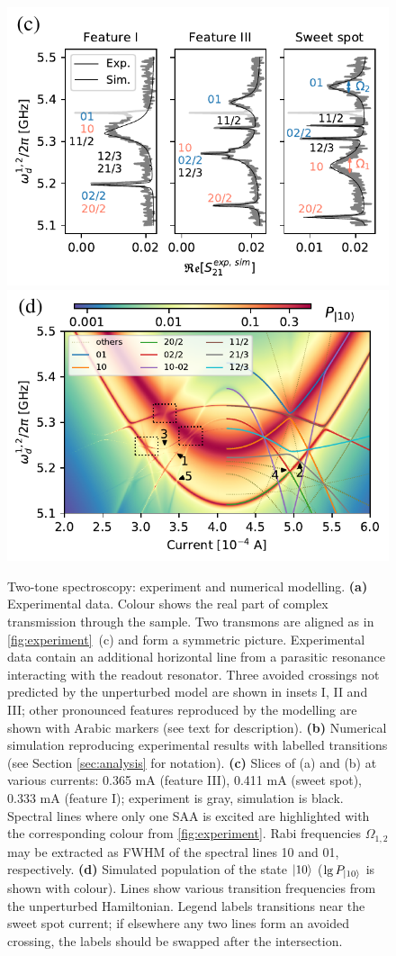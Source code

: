\documentclass[%
 pra,
 amsmath,amssymb,
 reprint,%
]{revtex4-1}
\begin{document}
\begin{figure}
	\includegraphics[width=.495\linewidth]{main_picture_slices}
	\includegraphics[width=.495\linewidth]{stationary}
	\caption{Two-tone spectroscopy: experiment 
	and numerical modelling. \textbf{(a)} 
	Experimental data. Colour shows the real part 
	of complex transmission  through the sample. 
	Two transmons are aligned as in 
	\autoref{fig:experiment}~(c) and form a 
	symmetric picture. Experimental data contain 
	an additional horizontal line from a 
	parasitic resonance interacting with the 
	readout resonator. Three avoided crossings 
	not predicted by the unperturbed model are 
	shown in insets I, II and III; other 
	pronounced features reproduced by the 
	modelling are shown with Arabic markers (see 
	text for description). \textbf{(b)} Numerical 
	simulation reproducing experimental results 
	with labelled transitions (see Section 
	\ref{sec:analysis} for notation). 
	\textbf{(c)} Slices of (a) and (b) at various 
	currents: 0.365 mA (feature III), 0.411 mA 
	(sweet spot), 0.333 mA (feature I); 
	experiment is gray, simulation is black. 
	Spectral lines where only one SAA is excited 
	are highlighted with the corresponding colour 
	from \autoref{fig:experiment}. Rabi 
	frequencies $\Omega_{1,2}$ may be extracted 
	as FWHM of the spectral lines 10 and 01, 
	respectively. \textbf{(d)} Simulated 
	population of the state $\ket{10}$ ($\lg 
	P_{\ket{10}}$ is shown with colour). Lines 
	show various transition frequencies from the 
	unperturbed Hamiltonian. Legend labels 
	transitions near the sweet spot current; if 
	elsewhere any two lines form an avoided 
	crossing, the labels should be swapped after 
	the intersection.}
	\label{fig:two-tone}
\end{figure}
\end{document}
